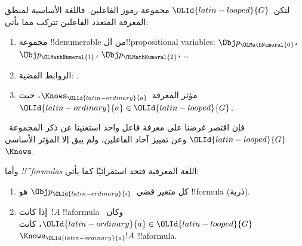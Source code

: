 \documentclass[../../../include/open-logic-section]{subfiles}
\begin{document}


\begin{defn}
لتكن~$\OLId{latin-looped}{G}$ مجموعة رموز الفاعلين. فاللغة الأساسية لمنطق المعرفة المتعدد
الفاعلين تتركب مما يأتي:
\begin{enumerate}
  \item مجموعة !!{denumerable} من ال!!{propositional variable}s:
    $\Obj p_\OLMathNumeral{0}$، $\Obj p_\OLMathNumeral{1}$، $\Obj p_\OLMathNumeral{2}$، \dots
  \item الروابط القضية: \startycommalist
  .
  \item مؤثر المعرفة~$\Knows_\OLId{latin-ordinary}{a}$، حيث~$\OLId{latin-ordinary}{a} \in \OLId{latin-looped}{G}$.
\end{enumerate}
\end{defn}

فإن اقتصر غرضنا على معرفة فاعل واحد استغنينا عن ذكر المجموعة~$\OLId{latin-looped}{G}$ وعن
تمييز آحاد الفاعلين، ولم يبق إلا المؤثر الأساسي~$\Knows$.

\begin{defn}
وأما \emph{!!^{formula}s} اللغة المعرفية فتحد استقرائيًا كما يأتي:
\begin{enumerate}


\item كل متغير قضي~$\Obj p_\OLId{latin-ordinary}{i}$ هو !!{formula} (ذرية).






\item إذا كانت~$!A$ !!a{formula} وكان~$\OLId{latin-ordinary}{a} \in \OLId{latin-looped}{G}$، كانت~$\Knows_\OLId{latin-ordinary}{a} !A$
  !!a{formula}.

\end{enumerate}
\end{defn}
\end{document}
